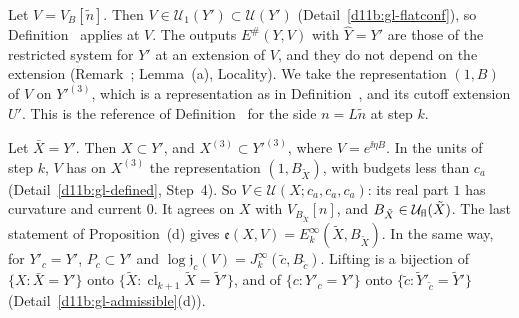 \begin{step}
Let $V=V_B[\tilde n]$. Then $V\in\mathcal U_1(Y')\subset\mathcal U(Y')$ (Detail~\ref{d11b:gl-flatconf}), so Definition~ applies at $V$. The outputs $E^\#(Y,V)$ with $\hat Y=Y'$ are those of the restricted system for $Y'$ at an extension of $V$, and they do not depend on the extension (Remark~; Lemma~(a), Locality). We take the representation $(1,B)$ of $V$ on $Y'^{(3)}$, which is a representation as in Definition~, and its cutoff extension $U'$. This is the reference of Definition~ for the side $n=L\tilde n$ at step $k$.
\end{step}

\begin{step}
Let $\bar X=Y'$. Then $X\subset Y'$, and $X^{(3)}\subset Y'^{(3)}$, where $V=e^{\ii\eta B}$. In the units of step $k$, $V$ has on $X^{(3)}$ the representation $(1,B_{\tilde X})$, with budgets less than $c_a$ (Detail~\ref{d11b:gl-defined}, Step~4). So $V\in\mathcal U(X;c_a,c_a,c_a)$: its real part $1$ has curvature and current $0$. It agrees on $X$ with $V_{B_{\tilde X}}[n]$, and $B_{\tilde X}\in\mathcal U_{\rm fl}(\tilde X)$. The last statement of Proposition~(d) gives $\mathfrak e(X,V)=E^\infty_k(\tilde X,B_{\tilde X})$. In the same way, for $Y'_c=Y'$, $P_c\subset Y'$ and $\log\mathfrak j_c(V)=J^\infty_k(\tilde c,B_{\tilde c})$. Lifting is a bijection of $\{X:\bar X=Y'\}$ onto $\{\tilde X:\operatorname{cl}_{k+1}\tilde X=\tilde Y'\}$, and of $\{c:Y'_c=Y'\}$ onto $\{\tilde c:\tilde Y'_{\tilde c}=\tilde Y'\}$ (Detail~\ref{d11b:gl-admissible}(d)).
\end{step}

